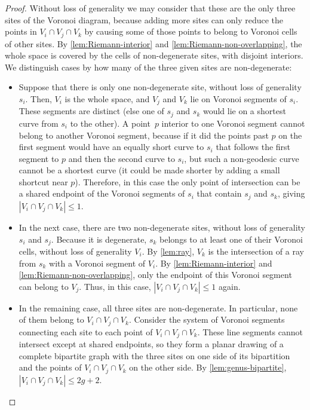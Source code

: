 \documentclass[11pt]{article}
\theoremstyle{definition}
\begin{document}
\begin{proof}
Without loss of generality we may consider that these are the only three sites of the Voronoi diagram, because adding more sites can only reduce the points in $V_i\cap V_j\cap V_k$ by causing some of those points to belong to Voronoi cells of other sites. By \cref{lem:Riemann-interior} and \cref{lem:Riemann-non-overlapping}, the whole space is covered by the cells of non-degenerate sites, with disjoint interiors. We distinguish cases by how many of the three given sites are non-degenerate:
\begin{itemize}
\item Suppose that there is only one non-degenerate site, without loss of generality $s_i$. Then, $V_i$ is the whole space, and $V_j$ and $V_k$ lie on Voronoi segments of $s_i$. These segments are distinct (else one of $s_j$ and $s_k$ would lie on a shortest curve from $s_i$ to the other). A point~$p$ interior to one Voronoi segment cannot belong to another Voronoi segment, because if it did the points past $p$ on the first segment would have an equally short curve to $s_i$ that follows the first segment to $p$ and then the second curve to $s_i$, but such a non-geodesic curve cannot be a shortest curve (it could be made shorter by adding a small shortcut near $p$). Therefore, in this case the only point of intersection can be a shared endpoint of the Voronoi segments of $s_i$ that contain $s_j$ and $s_k$, giving $|V_i\cap V_j\cap V_k|\le 1$.
\item In the next case, there are two non-degenerate sites, without loss of generality $s_i$ and $s_j$. Because it is degenerate, $s_k$ belongs to at least one of their Voronoi cells, without loss of generality $V_i$. By \cref{lem:ray}, $V_k$ is the intersection of a ray from $s_k$ with a Voronoi segment of $V_i$. By \cref{lem:Riemann-interior} and \cref{lem:Riemann-non-overlapping}, only the endpoint of this Voronoi segment can belong to $V_j$. Thus, in this case, $|V_i\cap V_j\cap V_k|\le 1$ again.
\item In the remaining case, all three sites are non-degenerate. In particular, none of them belong to $V_i\cap V_j\cap V_k$. Consider the system of Voronoi segments connecting each site to each point of $V_i\cap V_j\cap V_k$. These line segments cannot intersect except at shared endpoints, so they form a planar drawing of a complete bipartite graph with the three sites on one side of its bipartition and the points of $V_i\cap V_j\cap V_k$ on the other side.  By \cref{lem:genus-bipartite}, $|V_i\cap V_j\cap V_k|\le 2g+2$.\qedhere
\end{itemize}
\end{proof}
\fi
\end{document}
